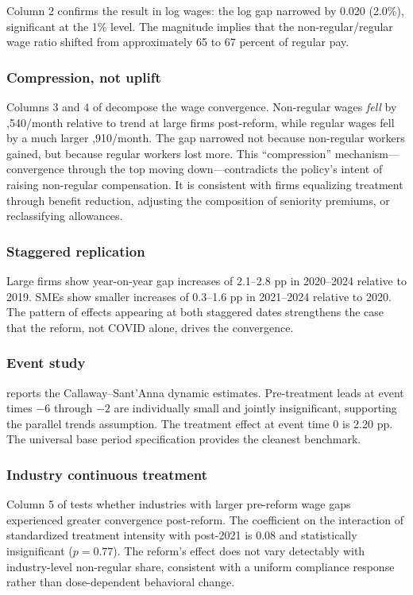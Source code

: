 \documentclass[12pt]{article}
\begin{document}
Column 2 confirms the result in log wages: the log gap narrowed by 0.020 (2.0\%), significant at the 1\% level. The magnitude implies that the non-regular/regular wage ratio shifted from approximately 65 to 67 percent of regular pay.



\subsubsection*{Compression, not uplift} Columns 3 and 4 of  decompose the wage convergence. Non-regular wages \textit{fell} by ,540/month relative to trend at large firms post-reform, while regular wages fell by a much larger ,910/month. The gap narrowed not because non-regular workers gained, but because regular workers lost more. This ``compression'' mechanism---convergence through the top moving down---contradicts the policy's intent of raising non-regular compensation. It is consistent with firms equalizing treatment through benefit reduction, adjusting the composition of seniority premiums, or reclassifying allowances.

\subsubsection*{Staggered replication} Large firms show year-on-year gap increases of 2.1--2.8 pp in 2020--2024 relative to 2019. SMEs show smaller increases of 0.3--1.6 pp in 2021--2024 relative to 2020. The pattern of effects appearing at both staggered dates strengthens the case that the reform, not COVID alone, drives the convergence.

\subsubsection*{Event study}  reports the Callaway--Sant'Anna dynamic estimates. Pre-treatment leads at event times $-6$ through $-2$ are individually small and jointly insignificant, supporting the parallel trends assumption. The treatment effect at event time 0 is 2.20 pp. The universal base period specification provides the cleanest benchmark.



\subsubsection*{Industry continuous treatment} Column 5 of  tests whether industries with larger pre-reform wage gaps experienced greater convergence post-reform. The coefficient on the interaction of standardized treatment intensity with post-2021 is 0.08 and statistically insignificant ($p = 0.77$). The reform's effect does not vary detectably with industry-level non-regular share, consistent with a uniform compliance response rather than dose-dependent behavioral change.
\end{document}
